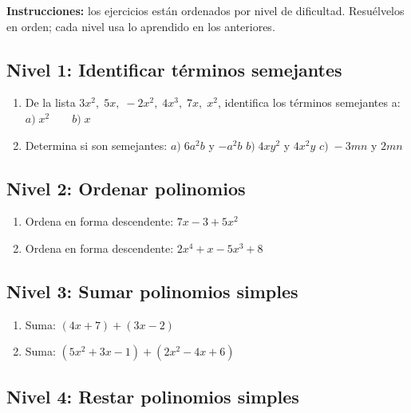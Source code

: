 \documentclass[12pt, letterpaper]{article}
\begin{document}
\begin{cuadroinfo}
  \small
  \textbf{Instrucciones:} los ejercicios están ordenados por nivel de dificultad. Resuélvelos en orden; cada nivel usa lo aprendido en los anteriores.
\end{cuadroinfo}

\subsection*{Nivel 1: Identificar términos semejantes}

\begin{enumerate}[leftmargin=*, resume]
  \item \facil{} De la lista $3x^2, \; 5x, \; -2x^2, \; 4x^3, \; 7x, \; x^2$, identifica los términos semejantes a: $a) \; x^2 \qquad b) \; x$

  \item \facil{} Determina si son semejantes: $a) \; 6a^2b$ y $-a^2b$ \quad $b) \; 4xy^2$ y $4x^2y$ \quad $c) \; -3mn$ y $2mn$
\end{enumerate}

\subsection*{Nivel 2: Ordenar polinomios}

\begin{enumerate}[leftmargin=*, resume]
  \item \facil{} Ordena en forma descendente: $7x - 3 + 5x^2$

  \item \facil{} Ordena en forma descendente: $2x^4 + x - 5x^3 + 8$
\end{enumerate}

\subsection*{Nivel 3: Sumar polinomios simples}

\begin{enumerate}[leftmargin=*, resume]
  \item \facil{} Suma: $(4x + 7) + (3x - 2)$

  \item \medio{} Suma: $(5x^2 + 3x - 1) + (2x^2 - 4x + 6)$
\end{enumerate}

\subsection*{Nivel 4: Restar polinomios simples}
\end{document}
